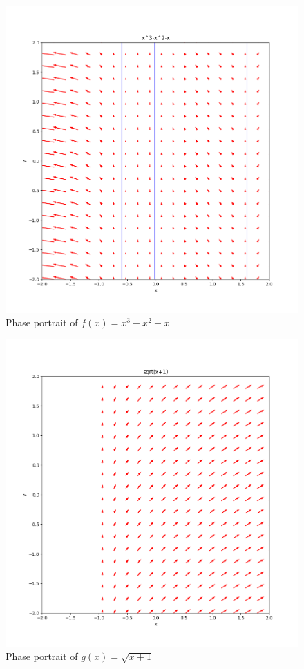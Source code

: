 \documentclass[11pt]{article}
\begin{document}
\begin{figure}[h!]
    \centering
    \includegraphics{phase12.png}
    \caption{Phase portrait of $f(x) = x^3 - x^2 -x$}
    \label{fig:phase12}
\end{figure}

\begin{figure}[h!]
    \centering
    \includegraphics{phase13.png}
    \caption{Phase portrait of $g(x) = \sqrt{x+1}$}
    \label{fig:phase13}
\end{figure}
\end{document}
